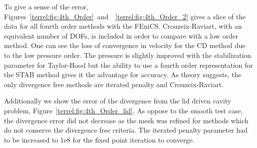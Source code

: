 To give a sense of the error,
Figures~\ref{terrel:fig:4th_Order}~and~~\ref{terrel:fig:4th_Order_2} gives a
slice of the data for all fourth order methods with the FEniCS.
Crouzeix-Raviart, with an equivalent number of DOFs, is included in order to
compare with a low order method.  One can see the loss of convergence in
velocity for the CD method due to the low pressure order.  The pressure is
slightly improved with the stabilization parameter for Taylor-Hood but the
ability to use a fourth order representation for the STAB method gives it the
advantage for accuracy.  As theory suggests, the only divergence free methods
are iterated penalty and Crouzeix-Raviart.

Additionally we show the error of the divergence from the lid driven cavity
problem, Figure~\ref{terrel:fig:4th_Order_lid}.  As oppose to the smooth test
case, the divergence error did not decrease as the mesh was refined for
methods which do not conserve the divergence free criteria.  The iterated
penalty parameter had to be increased to 1e8 for the fixed point iteration to
converge.





